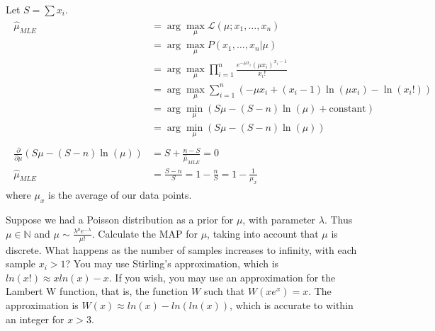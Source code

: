 \begin{Parts}
\begin{solution}
    Let $S=\sum x_i$.
    \begin{align*}
        \begin{aligned}
            \hat{\mu}_{MLE} &= \arg \max_\mu \mathcal{L}(\mu; x_1, \dots, x_n) \\
            &= \arg\max_\mu P(x_1, \dots, x_n|\mu) \\
            &= \arg\max_\mu \prod_{i=1}^n \frac{e^{-\mu x_i}(\mu x_i)^{x_i-1}}{x_i!}\\
            &= \arg\max_\mu \sum_{i=1}^n (-\mu x_i + (x_i - 1)\ln (\mu x_i)-\ln (x_i!))\\
            &= \arg\min_\mu (S\mu-(S-n)\ln (\mu)+\text{constant})\\
            &= \arg\min_\mu (S\mu-(S-n)\ln (\mu))\\\\
            \frac{\partial}{\partial \mu}(S\mu-(S-n)\ln (\mu)) &= S+\frac{n-S}{\hat{\mu}_{MLE}} = 0 \\
            \hat{\mu}_{MLE}&=\frac{S-n}{S}=1-\frac{n}{S}=1-\frac{1}{\mu_x}
        \end{aligned}
    \end{align*}
    where $\mu_x$ is the average of our data points.
\end{solution}

\iffalse
\Part
    Suppose we had a Poisson distribution as a prior for $\mu$, with parameter $\lambda$. Thus $\mu \in \mathbb{N}$ and $\mu \sim \frac{\lambda^\mu e^{-\lambda}}{\mu!}$. Calculate the MAP for $\mu$, taking into account that $\mu$ is discrete. What happens as the number of samples increases to infinity, with each sample $x_i > 1$? You may use Stirling's approximation, which is $ln(x!) \approx xln(x)-x$. If you wish, you may use an approximation for the Lambert W function, that is, the function $W$ such that $W(xe^x)=x$. The approximation is $W(x) \approx ln(x)-ln(ln(x))$, which is accurate to within an integer for $x>3$.


\end{Parts}

